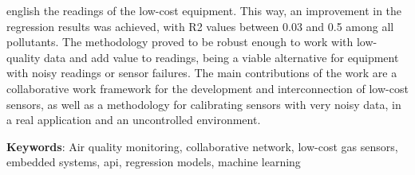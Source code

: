 \begin{resumo}[Abstract]
\begin{otherlanguage*}{english}
the readings of the low-cost equipment. This way, an improvement in the regression results was achieved, with R2 values between 0.03 and 0.5 among all pollutants. The methodology proved to be robust enough to work with low-quality data and add value to readings, being a viable alternative for equipment with noisy readings or sensor failures. The main contributions of the work are a collaborative work framework for the development and interconnection of low-cost sensors, as well as a methodology for calibrating sensors with very noisy data, in a real application and an uncontrolled environment.

		\textbf{Keywords}: Air quality monitoring, collaborative network, low-cost gas sensors, embedded systems, \acrshort{api}, regression models, machine learning
	\end{otherlanguage*}
\end{resumo}

{%
	\hypersetup{hidelinks}
	\listoffigures*
	\cleardoublepage
	
	\listoftables*
	\cleardoublepage
	
	
	\printnoidxglossary[type=acronym, sort=use, title=Lista de siglas, toctitle=Lista de siglas]
	\cleardoublepage

	\tableofcontents*
	\cleardoublepage
	
}%
